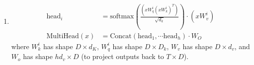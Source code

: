\documentclass{article}
\begin{document}
\begin{itemize}
\begin{enumerate}
        \item \begin{align*}
            \text{head}_i &= \text{softmax}\left( \frac{(xW_q^i (xW_k^i)^T)}{\sqrt{d_k}}\right) \cdot (xW_v^i)\\
            \text{MultiHead}(x) &= \text{Concat}(\text{head}_1, \cdots \text{head}_h) \cdot W_O
        \end{align*}
        where $W_k^i$ has shape $D \times d_K$, $W_q^i$ has shape $D \times D_k$, $W_v$ has shape $D \times d_v$, and $W_o$ has shape $h d_v \times D$ (to project outputs back to $T \times D$).

    \end{enumerate}

\end{itemize}
\end{document}
